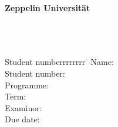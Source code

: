 \begin{centering}
\Large \textbf{Zeppelin Universität}\\
\Large \Chair \\
\vfill
\LARGE \textbf{\Title} \\
\vfill
\LARGE \Arbeit\\
\vfill
\begin{small}
\begin{doublespace}
\begin{tabbing}
	Student numberrrrrrrr \=\kill
	Name:\>\Name\\
	Student number:\>\MatrikelNummer\\
	Programme:\>\Programme\\
	Term:\>\Semester\\
	Examinor:\>\Pruefer\\
	Due date:\>\Date
	\end{tabbing}
\end{doublespace}
\end{small}
\end{centering}\vspace{1cm}

